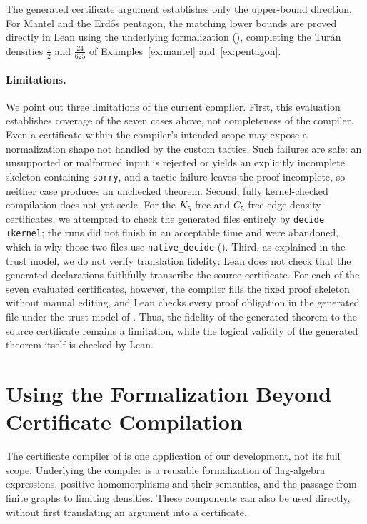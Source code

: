 \documentclass{article}
\newcommand{\lean}[1]{\texttt{#1}}
\begin{document}
The generated certificate argument establishes only the upper-bound direction.
For Mantel and the Erd\H{o}s pentagon,
the matching lower bounds are proved directly in Lean using the underlying
formalization (), completing the
Tur\'an densities $\tfrac12$ and $\tfrac{24}{625}$ of Examples~\ref{ex:mantel}
and~\ref{ex:pentagon}.

\paragraph{Limitations.}
\label{sec:flagmatic-open}
We point out three limitations of the current compiler.
First, this evaluation establishes coverage of the seven cases above, not
completeness of the compiler.  Even a certificate within the compiler's
intended scope may expose a normalization shape not handled by the custom
tactics.  Such failures are safe: an unsupported or malformed input is
rejected or yields an explicitly incomplete skeleton containing \lean{sorry},
and a tactic failure leaves the proof incomplete, so neither case produces an
unchecked theorem.
Second, fully kernel-checked compilation does not yet scale.  For the
$K_5$-free and $C_5$-free edge-density certificates, we attempted to check the
generated files entirely by \lean{decide +kernel}; the runs did not finish in
an acceptable time and were abandoned, which is why those two files use
\lean{native\_decide} ().
Third, as explained in the trust model, we do not verify translation fidelity:
Lean does not check that the generated declarations faithfully transcribe the
source certificate.  For each of the seven evaluated certificates, however,
the compiler fills the fixed proof skeleton without manual editing, and Lean
checks every proof obligation in the generated file under the trust model of
.  Thus, the fidelity of the generated theorem to the
source certificate remains a limitation, while the logical validity of the
generated theorem itself is checked by Lean.


\section{Using the Formalization Beyond Certificate Compilation}
\label{sec:lowerbounds}

The certificate compiler of  is one application of our
development, not its full scope.  Underlying the compiler is a reusable
formalization of flag-algebra expressions, positive homomorphisms and their
semantics, and the passage from finite graphs to limiting densities.  These
components can also be used directly, without first translating an argument
into a certificate.
\end{document}
